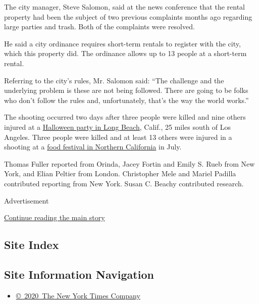 The city manager, Steve Salomon, said at the news conference that the
rental property had been the subject of two previous complaints months
ago regarding large parties and trash. Both of the complaints were
resolved.

He said a city ordinance requires short-term rentals to register with
the city, which this property did. The ordinance allows up to 13 people
at a short-term rental.

Referring to the city's rules, Mr. Salomon said: ``The challenge and the
underlying problem is these are not being followed. There are going to
be folks who don't follow the rules and, unfortunately, that's the way
the world works.''

The shooting occurred two days after three people were killed and nine
others injured at a
\href{https://www.nytimes3xbfgragh.onion/2019/10/30/us/long-beach-shooting.html?rref=collection\%2Fbyline\%2Felian-peltier\&action=click\&contentCollection=undefined\&region=stream\&module=stream_unit\&version=latest\&contentPlacement=2\&pgtype=collection}{Halloween
party in Long Beach}, Calif., 25 miles south of Los Angeles. Three
people were killed and at least 13 others were injured in a shooting at
a
\href{https://www.nytimes3xbfgragh.onion/2019/07/30/us/gilroy-garlic-fest-shooting.html?module=inline}{food
festival in Northern California} in July.

Thomas Fuller reported from Orinda, Jacey Fortin and Emily S. Rueb from
New York, and Elian Peltier from London. Christopher Mele and Mariel
Padilla contributed reporting from New York. Susan C. Beachy contributed
research.

Advertisement

\protect\hyperlink{after-bottom}{Continue reading the main story}

\hypertarget{site-index}{%
\subsection{Site Index}\label{site-index}}

\hypertarget{site-information-navigation}{%
\subsection{Site Information
Navigation}\label{site-information-navigation}}

\begin{itemize}
\tightlist
\item
  \href{https://help.nytimes3xbfgragh.onion/hc/en-us/articles/115014792127-Copyright-notice}{©~2020~The
  New York Times Company}
\end{itemize}

